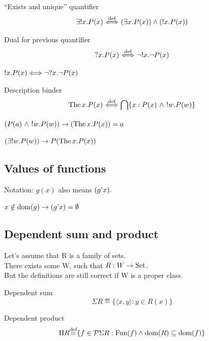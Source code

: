 \documentclass[10pt,a4paper]{article}
\begin{document}
\begin{definition} ``Exists and unique'' quantifier
$$\exists !x. P(x) {\stackrel{{\textrm{def}}}{\ \Longleftrightarrow\ }} (\exists x. P(x))\land(!x. P(x))$$
\end{definition}

\begin{definition}  Dual for previous quantifier 
$$?x. P(x) {\stackrel{{\textrm{def}}}{\ \Longleftrightarrow\ }} \neg !x. \neg P(x)$$
\end{definition}

\begin{exercise}
$!x. P(x) \Longleftrightarrow \neg ?x. \neg P(x)$
\end{exercise}

\begin{definition} Description binder
$${\textrm{The\,}} x. P(x) {\stackrel{{\textrm{def}}}{\ \Longleftrightarrow\ }} {\bigcap} \{x:P(x)\ \land\ !w.P(w)\}$$
\end{definition}

\begin{exercise}
$(P(a)\ \land\ !w.P(w)) \rightarrow ({\textrm{The\,}} x. P(x))=a$
\end{exercise}

\begin{exercise}
$(\exists !w.P(w)) \rightarrow P({\textrm{The\,}} x. P(x))$
\end{exercise}

\subsection{Values of functions}
Notation: $g(x)$ also means $(g{\textrm{'}} x).$\\

\begin{exercise}
$x\notin {\textrm{dom}}(g)\to (g{\textrm{'}} x)=\emptyset$
\end{exercise}

\subsection{Dependent sum and product}
Let's assume that R is a family of sets.\\
There exists some W, such that $R:W\to{\textrm{Set}}$.\\
But the definitions are still correct if W is a proper class.\\
\begin{definition} Dependent sum
$$\Sigma R\eqdef\{\langle x, y\rangle: y\in R(x)\}$$
\end{definition}
\begin{definition} Dependent product
$$\Pi R{\stackrel{{\textrm{def}}}{=}}\{ f\in {\mathcal{P}}\Sigma R: {\textrm{Fun}}(f)\land {\textrm{dom}}(R)\subseteq {\textrm{dom}}(f)\}$$
\end{definition}
\end{document}
